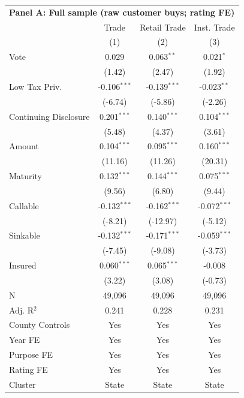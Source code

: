 \begingroup
\centering
\begin{tabular*}{\textwidth}{@{\extracolsep{\fill}}lccc}
\multicolumn{5}{l}{\textbf{Panel A: Full sample (raw customer buys; rating FE)}}\\

\addlinespace
   \toprule
                         & Trade          & Retail Trade   & Inst. Trade\\  
                         & (1)            & (2)            & (3)\\  
   \midrule 
   Vote                  & 0.029          & 0.063$^{**}$   & 0.021$^{*}$\\   
                         & (1.42)        & (2.47)        & (1.92)\\   
   Low Tax Priv.         & -0.106$^{***}$ & -0.139$^{***}$ & -0.023$^{**}$\\   
                         & (-6.74)       & (-5.86)       & (-2.26)\\   
   Continuing Disclosure & 0.201$^{***}$  & 0.140$^{***}$  & 0.104$^{***}$\\   
                         & (5.48)        & (4.37)        & (3.61)\\   
   Amount                & 0.104$^{***}$  & 0.095$^{***}$  & 0.160$^{***}$\\   
                         & (11.16)       & (11.26)       & (20.31)\\   
   Maturity              & 0.132$^{***}$  & 0.144$^{***}$  & 0.075$^{***}$\\   
                         & (9.56)        & (6.80)        & (9.44)\\   
   Callable              & -0.132$^{***}$ & -0.162$^{***}$ & -0.072$^{***}$\\   
                         & (-8.21)       & (-12.97)      & (-5.12)\\   
   Sinkable              & -0.132$^{***}$ & -0.171$^{***}$ & -0.059$^{***}$\\   
                         & (-7.45)       & (-9.08)       & (-3.73)\\   
   Insured               & 0.060$^{***}$  & 0.065$^{***}$  & -0.008\\   
                         & (3.22)        & (3.08)        & (-0.73)\\   
   \hline
   N          & 49,096         & 49,096         & 49,096\\  
   Adj. R$^2$        & 0.241          & 0.228          & 0.231\\  
   County Controls       & Yes            & Yes            & Yes\\  
   Year FE               & Yes            & Yes            & Yes\\  
   Purpose FE            & Yes            & Yes            & Yes\\  
   Rating FE             & Yes            & Yes            & Yes\\  
   Cluster              & State & State & State\\  
   \bottomrule
\end{tabular*}
\par\endgroup
